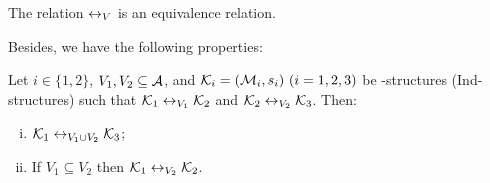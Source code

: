 \documentclass{article}
\begin{document}


 \begin{lemma}\label{lem:equive}
  The relation $\leftrightarrow_V$ is an equivalence relation.
\end{lemma}

Besides, we have the following properties:

\begin{proposition}\label{div}
Let $i\in \{1,2\}$, $V_1,V_2\subseteq\cal A$,
and ${\cal K}_i=({\cal M}_i,s_i)~(i=1,2,3)$ be \MPK-structures (Ind-structures)
 such that
${\cal K}_1\leftrightarrow_{V_1}{\cal K}_2$ and ${\cal K}_2\leftrightarrow_{V_2}{\cal K}_3$.
 Then:
 \begin{enumerate}[(i)]
   \item ${\cal K}_1\leftrightarrow_{V_1\cup V_2}{\cal K}_3$;
   \item If $V_1 \subseteq V_2$ then ${\cal K}_1 \leftrightarrow_{V_2} {\cal K}_2$.
 \end{enumerate}
\end{proposition}
\end{document}
